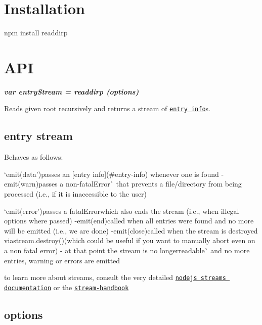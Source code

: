 \section*{Installation}

\begin{DoxyVerb}npm install readdirp
\end{DoxyVerb}


\section*{A\+PI}

{\itshape {\bfseries var entry\+Stream = readdirp (options)}}

Reads given root recursively and returns a {\ttfamily stream} of \href{#entry-info}{\tt entry info}s.

\subsection*{entry stream}

Behaves as follows\+:


\begin{DoxyItemize}
\item `emit(\textquotesingle{}data'){\ttfamily passes an \mbox{[}entry info\mbox{]}(\#entry-\/info) whenever one is found -\/}emit(\textquotesingle{}warn\textquotesingle{}){\ttfamily passes a non-\/fatal}Error\`{} that prevents a file/directory from being processed (i.\+e., if it is inaccessible to the user)
\item `emit(\textquotesingle{}error'){\ttfamily passes a fatal}Error{\ttfamily which also ends the stream (i.\+e., when illegal options where passed) -\/}emit(\textquotesingle{}end\textquotesingle{}){\ttfamily called when all entries were found and no more will be emitted (i.\+e., we are done) -\/}emit(\textquotesingle{}close\textquotesingle{}){\ttfamily called when the stream is destroyed via}stream.\+destroy(){\ttfamily (which could be useful if you want to manually abort even on a non fatal error) -\/ at that point the stream is no longer}readable\`{} and no more entries, warning or errors are emitted
\item to learn more about streams, consult the very detailed \href{http://nodejs.org/api/stream.html}{\tt nodejs streams documentation} or the \href{https://github.com/substack/stream-handbook}{\tt stream-\/handbook}
\end{DoxyItemize}

\subsection*{options}


